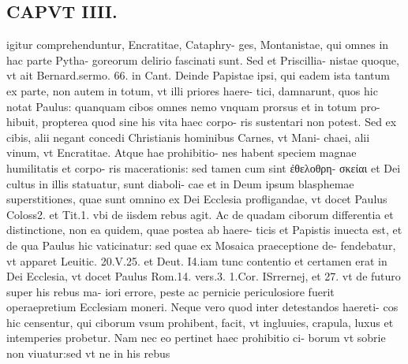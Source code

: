 \documentclass{article}
\begin{document}
\begin{pages}
\section*{CAPVT  IIII. }
\marginpar{[ p.189 ]}\pstart igitur comprehenduntur, Encratitae, Cataphry- ges, Montanistae, qui omnes in hac parte Pytha- goreorum delirio fascinati sunt. Sed et Priscillia- nistae quoque, vt ait Bernard.sermo. 66. in Cant. Deinde Papistae ipsi, qui eadem ista tantum ex parte, non autem in totum, vt illi priores haere- tici, damnarunt, quos hic notat Paulus: quanquam cibos omnes nemo vnquam prorsus et in totum pro- hibuit, propterea quod sine his vita haec corpo- ris sustentari non potest. Sed ex cibis, alii negant concedi Christianis hominibus Carnes, vt Mani- chaei, alii vinum, vt Encratitae. Atque hae prohibitio- nes habent speciem magnae humilitatis et corpo- ris macerationis: sed tamen cum sint ἐθελοθρη- σκείαι et Dei cultus in illis statuatur, sunt diaboli- cae et in Deum ipsum blasphemae superstitiones, quae sunt omnino ex Dei Ecclesia profligandae, vt docet Paulus Coloss2. et Tit.1. vbi de iisdem rebus agit. Ac de quadam ciborum differentia et distinctione, non ea quidem, quae postea ab haere- ticis et Papistis inuecta est, et de qua Paulus hic vaticinatur: sed quae ex Mosaica praeceptione de- fendebatur, vt apparet Leuitic. 20.V.25. et Deut. I4.iam tunc contentio et certamen erat in Dei Ecclesia, vt docet Paulus Rom.14. vers.3. 1.Cor. ISrrernej, et 27. vt de futuro super his rebus ma- iori errore, peste ac pernicie periculosiore fuerit operaepretium Ecclesiam moneri. Neque vero quod inter detestandos haereti- cos hic censentur, qui ciborum vsum prohibent, facit, vt ingluuies, crapula, luxus et intemperies probetur. Nam nec eo pertinet haec prohibitio ci- borum vt sobrie non viuatur:sed vt ne in his rebus  \pend

\end{pages}
\end{document}
